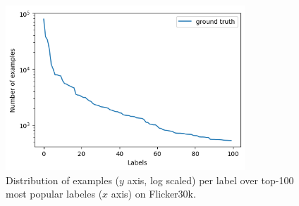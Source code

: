 \begin{figure}
  \includegraphics[width=0.8\textwidth]{figures/number-of-examples-per-label-over-top-100-most-popular-labels.png}
  \caption[Number of examples per label over top-100 most popular labels on Flicker30k]{Distribution of examples ($y$ axis, log scaled) per label over top-100 most popular labeles ($x$ axis) on Flicker30k.}
  \label{tab:flickr30k-label-distribution-top10}
\end{figure}


